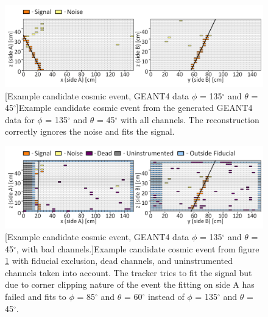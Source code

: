 \begin{figure}[!h]
 \centering
 \includegraphics[width=\linewidth]{Chapter6/Figs/Raster/135,45_85,60__noDead_updatedAxis_cosmicCandidate195939MedText.png}
 [Example candidate cosmic event, GEANT4 data $\phi$ = 135$^\circ$ and $\theta$ = 45$^\circ$]{Example candidate cosmic event from the generated GEANT4 data for $\phi$ = 135$^\circ$ and $\theta$ = 45$^\circ$ with all channels. The reconstruction correctly ignores the noise and fits the signal.} 
 \label{fig:badFitNoFiducial}
\end{figure}

\begin{figure}[!h]
 \centering
 \includegraphics[width=\linewidth]{Chapter6/Figs/Raster/135,45_85,60__withDead_updatedAxis_cosmicCandidate195939MedText.png}
 [Example candidate cosmic event, GEANT4 data $\phi$ = 135$^\circ$ and $\theta$ = 45$^\circ$, with bad channels.]{Example candidate cosmic event from figure \ref{fig:badFitNoFiducial} with fiducial exclusion, dead channels, and uninstrumented channels taken into account. The tracker tries to fit the signal but due to corner clipping nature of the event the fitting on side A has failed and fits to $\phi$ = 85$^\circ$ and $\theta$ = 60$^\circ$ instead of $\phi$ = 135$^\circ$ and $\theta$ = 45$^\circ$. } 
 \label{fig:badFitWithFiducial}
\end{figure}

